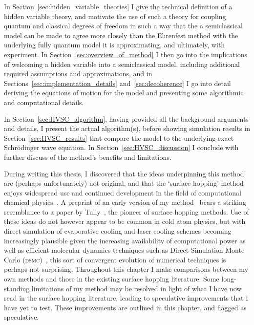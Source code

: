 In Section~\ref{sec:hidden_variable_theories} I give the technical definition of a hidden variable theory, and motivate the use of such a theory for coupling quantum and classical degrees of freedom in such a way that the a semiclassical model can be made to agree more closely than the Ehrenfest method with the underlying fully quantum model it is approximating, and ultimately, with experiment. In Section~\ref{sec:overview_of_method} I then go into the implications of welcoming a hidden variable into a semiclassical model, including additional required assumptions and approximations, and in Sections~\ref{sec:implementation_details} and~\ref{sec:decoherence} I go into detail deriving the equations of motion for the model and presenting some algorithmic and computational details.

In Section~\ref{sec:HVSC_algorithm}, having provided all the background arguments and details, I present the actual algorithm(s), before showing simulation results in Section~\ref{sec:HVSC_results} that compare the model to the underlying exact Schr\"odinger wave equation. In Section~\ref{sec:HVSC_discussion} I conclude with further discuss of the method's benefits and limitations.

During writing this thesis, I discovered that the ideas underpinning this method are (perhaps unfortunately) not original, and that the `surface hopping' method enjoys widespread use and continued development in the field of computational chemical physics~\cite{doi:10.1063/1.459170, A801824C, doi:10.1146/annurev-physchem-040215-112245, doi:10.1063/1.1675788, doi:10.1063/1.3575588, doi:10.1063/1.447708, doi:10.1063/1.3489004, doi:10.1063/1.2715585, C6SC01319H, doi:10.1063/1.479058, doi:10.1063/1.4829856}. A preprint of an early version of my method~\cite{billington_monte_2015} bears a striking resemblance to a paper by Tully~\cite{doi:10.1063/1.459170}, the pioneer of surface hopping methods. Use of these ideas do not however appear to be common in cold atom physics, but with direct simulation of evaporative cooling and laser cooling schemes becoming increasingly plausible given the increasing availability of computational power as well as efficient molecular dynamics techniques such as Direct Simulation Monte Carlo (\textsc{dsmc})~\cite{DIETRICH1996328}, this sort of convergent evolution of numerical techniques is perhaps not surprising. Throughout this chapter I make comparisons between my own methods and those in the existing surface hopping literature. Some long-standing limitations of my method may be resolved in light of what I have now read in the surface hopping literature, leading to speculative improvements that I have yet to test. These improvements are outlined in this chapter, and flagged as speculative.

